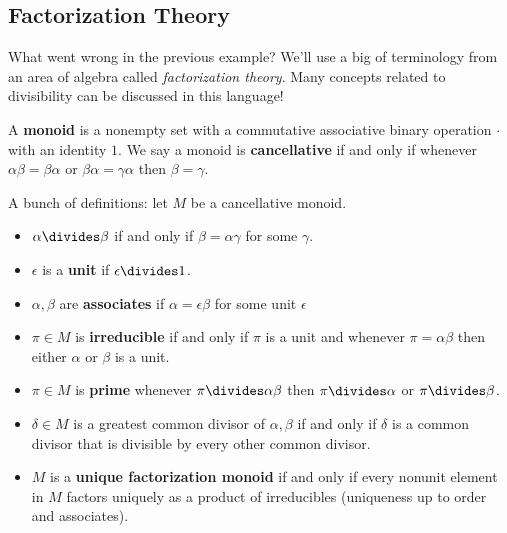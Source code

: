 \hypertarget{factorization-theory}{%
\subsection{Factorization Theory}\label{factorization-theory}}

What went wrong in the previous example? We'll use a big of terminology
from an area of algebra called \emph{factorization theory}. Many
concepts related to divisibility can be discussed in this language!

\begin{definition}[Monoid]

A \textbf{monoid} is a nonempty set with a commutative associative
binary operation \(\cdot\) with an identity \(1\). We say a monoid is
\textbf{cancellative} if and only if whenever
\(\alpha \beta= \beta \alpha\) or \(\beta \alpha = \gamma \alpha\) then
\(\beta = \gamma\).

\end{definition}

\begin{definition}

A bunch of definitions: let \(M\) be a cancellative monoid.

\begin{itemize}
\tightlist
\item
  \(\alpha\divides \beta\) if and only if \(\beta= \alpha \gamma\) for
  some \(\gamma\).
\item
  \(\epsilon\) is a \textbf{unit} if \(\epsilon\divides 1\).
\item
  \(\alpha , \beta\) are \textbf{associates} if
  \(\alpha = \epsilon \beta\) for some unit \(\epsilon\)
\item
  \(\pi\in M\) is \textbf{irreducible} if and only if \(\pi\) is a unit
  and whenever \(\pi= \alpha \beta\) then either \(\alpha\) or \(\beta\)
  is a unit.
\item
  \(\pi \in M\) is \textbf{prime} whenever \(\pi\divides \alpha \beta\)
  then \(\pi\divides \alpha\) or \(\pi\divides \beta\).
\item
  \(\delta \in M\) is a greatest common divisor of \(\alpha, \beta\) if
  and only if \(\delta\) is a common divisor that is divisible by every
  other common divisor.
\item
  \(M\) is a \textbf{unique factorization monoid} if and only if every
  nonunit element in \(M\) factors uniquely as a product of irreducibles
  (uniqueness up to order and associates).
\end{itemize}

\end{definition}

